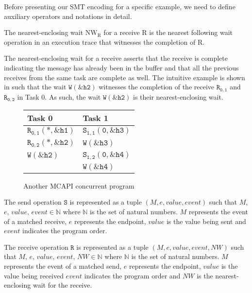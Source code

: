 Before presenting our SMT encoding for a specific example, we need to define auxiliary operators and notations in detail. 

\begin{definition}
The nearest-enclosing wait $\mathrm{NW_R}$ for a receive $\mathrm{R}$ is the nearest following wait operation in an execution trace that witnesses the completion of $\mathrm{R}$.
\end{definition}

The nearest-enclosing wait for a receive asserts that the receive is complete indicating the message has already been in the buffer and that all the previous receives from the same task are complete as well. The intuitive example is shown in  such that the wait $\mathtt{W{(\&h2)}}$ witnesses the completion of the receive $\mathtt{R_{0,1}}$ and $\mathtt{R_{0,2}}$ in Task 0. As such, the wait $\mathtt{W{(\&h2)}}$ is their nearest-enclosing wait.

\begin{figure}
\begin{center}
\setlength{\tabcolsep}{2pt}
\begin{tabular}[c]{l|l}
Task 0 & Task 1  \\
\hline
$\mathtt{R_{0,1}(*,\&h1)}$ & $\mathtt{S_{1,1}(0,\&h3)}$\\
$\mathtt{R_{0,2}(*,\&h2)}$ & $\mathtt{W{(\&h3)}}$ \\
$\mathtt{W{(\&h2)}}$ & $\mathtt{S_{1,2}(0,\&h4)}$ \\
& $\mathtt{W{(\&h4)}}$\\

\end{tabular}
\end{center}
\caption{Another MCAPI concurrent program}
\label{fig:nearest}
\end{figure}

\begin{definition}
The send operation $\mathtt{S}$ is represented as a tuple $(M,e,value,event)$ such that $\mathit{M}$, $\mathit{e}$, $\mathit{value}$, $\mathit{event}$$ \in \mathbb{N}$ where $\mathbb{N}$ is the set of natural numbers. $M$ represents the event of a matched receive, $e$ represents the endpoint, $value$ is the value being sent and $event$ indicates the program order.
\label{def:snd}
\end{definition}

\begin{definition}
The receive operation $\mathtt{R}$ is represented as a tuple $(M,e,value,event,NW)$ such that $\mathit{M}$, $\mathit{e}$, $\mathit{value}$, $\mathit{event}$, $\mathit{NW}$$ \in \mathbb{N}$ where $\mathbb{N}$ is the set of natural numbers. $M$ represents the event of a matched send, $e$ represents the endpoint, $value$ is the value being received $event$ indicates the program order and $\mathit{NW}$ is the nearest-enclosing wait for the receive.
\label{def:rcv}
\end{definition}

